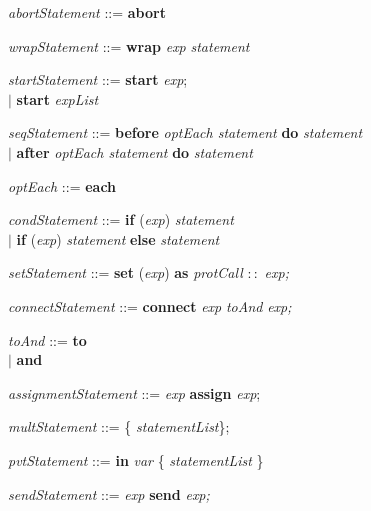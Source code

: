 \textit{abortStatement} ::= \textbf{abort}\smallskip

\textit{wrapStatement} ::= \textbf{wrap} \textit{exp} \textit{statement}\smallskip

\textit{startStatement} ::= \textbf{start} \textit{exp}; \\
\hspace*{5.3em} $ | $ \hspace{0.4em} \textbf{start} \textit{expList}\smallskip

\textit{seqStatement} ::= \textbf{before} \textit{optEach statement} \textbf{do} \textit{statement} \\
\hspace*{5.3em} $ | $ \hspace{0.4em} \textbf{after} \textit{optEach statement} \textbf{do} \textit{statement}\smallskip

\textit{optEach} ::= \textbf{each}\smallskip

\textit{condStatement} ::=  \textbf{if} (\textit{exp}) \textit{statement}\\
\hspace*{5.3em} $ | $ \hspace{0.4em} \textbf{if} (\textit{exp}) \textit{statement} \textbf{else} \textit{statement}\smallskip

\textit{setStatement} ::=  \textbf{set} (\textit{exp}) \textbf{as} \textit{protCall} $::$ \textit{exp;}\smallskip

\textit{connectStatement} ::= \textbf{connect} \textit{exp} \textit{toAnd} \textit{exp;}\smallskip

\textit{toAnd} ::= \hspace{2em} \textbf{to}\\
\hspace*{5.3em} $ | $ \hspace{0.4em} \textbf{and}\smallskip

\textit{assignmentStatement} ::= \textit{exp} \textbf{assign} \textit{exp};\smallskip

\textit{multStatement} ::=   \{ \textit{statementList}\};\smallskip

\textit{pvtStatement} ::= \textbf{in} \textit{var} \{ \textit{statementList} \}\smallskip

\textit{sendStatement} ::= \textit{exp} \textbf{send} \textit{exp;}\smallskip

